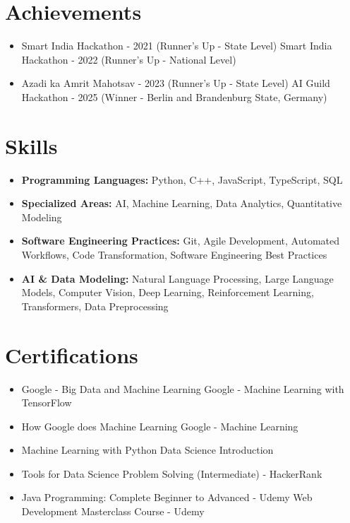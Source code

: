 \documentclass[a4paper,10pt]{article}
\begin{document}
\section*{Achievements}
\begin{itemize}
\item Smart India Hackathon - 2021 (Runner's Up - State Level) \hfill Smart India Hackathon - 2022 (Runner's Up - National Level)
\item Azadi ka Amrit Mahotsav - 2023 (Runner's Up - State Level) \hfill AI Guild Hackathon - 2025 (Winner - Berlin and Brandenburg State, Germany)
\end{itemize}

\section*{Skills}
\begin{itemize}
  \item \textbf{Programming Languages:} Python, C++, JavaScript, TypeScript, SQL
  \item \textbf{Specialized Areas:} AI, Machine Learning, Data Analytics, Quantitative Modeling
  \item \textbf{Software Engineering Practices:} Git, Agile Development, Automated Workflows, Code Transformation, Software Engineering Best Practices
  \item \textbf{AI \& Data Modeling:} Natural Language Processing, Large Language Models, Computer Vision, Deep Learning, Reinforcement Learning, Transformers, Data Preprocessing
\end{itemize}

\section*{Certifications}
\begin{itemize}
\item Google - Big Data and Machine Learning \hfill Google - Machine Learning with TensorFlow
\item How Google does Machine Learning \hfill Google - Machine Learning
\item Machine Learning with Python \hfill Data Science Introduction
\item Tools for Data Science \hfill Problem Solving (Intermediate) - HackerRank
\item Java Programming: Complete Beginner to Advanced - Udemy \hfill Web Development Masterclass Course - Udemy
\end{itemize}
\end{document}
